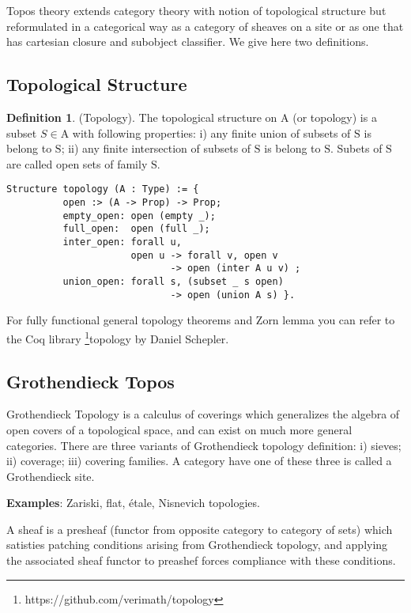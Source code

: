 \documentclass{article}
\theoremstyle{definition}
\newtheorem{definition}{Definition}
\begin{document}
Topos theory extends category theory with notion of topological
structure but reformulated in a categorical way
as a category of sheaves on a site or as one that has cartesian closure
and subobject classifier. We give here two definitions.

\subsection{Topological Structure}

\begin{definition} (Topology). The topological structure on $\mathrm{A}$
(or topology) is a subset $S \in \mathrm{A}$ with following properties:
i) any finite union of subsets of $\mathrm{S}$ is belong to $\mathrm{S}$;
ii) any finite intersection of subsets of $\mathrm{S}$ is belong to $\mathrm{S}$.
Subets of $\mathrm{S}$ are called open sets of family $\mathrm{S}$.
\begin{lstlisting}
Structure topology (A : Type) := {
          open :> (A -> Prop) -> Prop;
          empty_open: open (empty _);
          full_open:  open (full _);
          inter_open: forall u,
                      open u -> forall v, open v
                             -> open (inter A u v) ;
          union_open: forall s, (subset _ s open)
                             -> open (union A s) }.
\end{lstlisting}
For fully functional general topology theorems and Zorn lemma you can refer to
the Coq library \footnote{https://github.com/verimath/topology}{topology} by Daniel Schepler.
\end{definition}

\subsection{Grothendieck Topos}

Grothendieck Topology is a calculus of coverings which generalizes the algebra
of open covers of a topological space, and can exist on much more general categories.
There are three variants of Grothendieck topology definition:
i) sieves; ii) coverage; iii) covering families.
A category have one of these three is called a Grothendieck site.

{\bf Examples}: Zariski, flat, étale, Nisnevich topologies.

A sheaf is a presheaf (functor from opposite category to category of sets) which
satisties patching conditions arising from Grothendieck topology, and applying
the associated sheaf functor to preashef forces compliance with these conditions.
\end{document}
